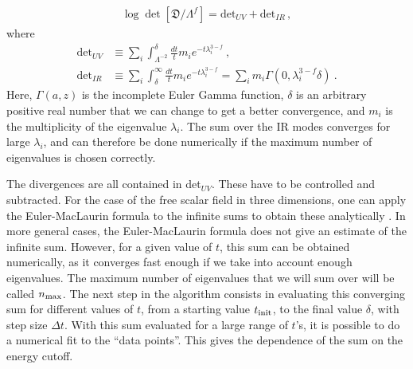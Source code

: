 \documentclass[12pt]{article}
\numberwithin{equation}{section}
\begin{document}
%
\begin{align}\label{eqn:detIRplusUV}
	\log \det\left[\mathfrak{D}/\Lambda^f \right] =  \textrm{det}_{UV} + \textrm{det}_{IR} \, ,
\end{align}
%
where 
%
\begin{equation}
\begin{split}
	\textrm{det}_{UV} &\equiv  \sum_{i}\int_{\Lambda^{-2}}^{\delta} \frac{dt}{t}  m_i e^{-t \lambda_{i}^{3-f}} \ , \\
	\textrm{det}_{IR} &\equiv \sum_{i} \int_{\delta}^{\infty} \frac{dt}{t} m_i e^{-t \lambda_{i}^{3-f}} = \sum_{i}m_i \Gamma(0,\lambda_i^{3-f} \delta)\ . \label{eqn:detUV}
\end{split}
\end{equation}
%
Here, $\Gamma(a,z)$ is the incomplete Euler Gamma function, $\delta$ is an arbitrary positive real number that we can change to get a better convergence, and $m_i$ is the multiplicity of the eigenvalue $\lambda_i$. The sum over the IR modes converges for large $\lambda_i$, and can therefore be done numerically if the maximum number of eigenvalues is chosen correctly.

The divergences are all contained in det$_{UV}$. These have to be controlled and subtracted. For the case of the free scalar field in three dimensions, one can apply the Euler-MacLaurin formula to the infinite sums to obtain these analytically \cite{Anninos:2012ft}. In more general cases, the Euler-MacLaurin formula does not give an estimate of the infinite sum. However, for a given value of $t$, this sum can be obtained numerically, as it converges fast enough if we take into account enough eigenvalues. The maximum number of eigenvalues that we will sum over will be called $n_{\rm max}$.  
The next step in the algorithm consists in evaluating this converging sum for different values of $t$, from a starting value $t_{\rm init}$, to the final value $\delta$, with step size $\Delta t$. With this sum evaluated for a large range of $t$'s, it is possible to do a numerical fit to the ``data points''. This gives the dependence of the sum on the energy cutoff. 
\end{document}
